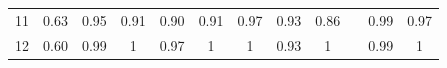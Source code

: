 \documentclass[twoside,11pt]{article}
\begin{document}
\begin{table}[H]
{\begin{tabular}{ccccccccclcc}
\multicolumn{1}{|c|}{11}                                                                          & \multicolumn{1}{c|}{0.63}                                                           & \multicolumn{1}{c|}{\cellcolor[HTML]{ECF4FF}0.95}                                              & \multicolumn{1}{c|}{0.91}                                                                & \multicolumn{1}{c|}{0.90}                                                                & \multicolumn{1}{c|}{0.91}                                                                & \multicolumn{1}{c|}{\cellcolor[HTML]{FFCCC9}0.97}                                           & \multicolumn{1}{c|}{0.93}                                                                   & \multicolumn{1}{c|}{0.86}                                                                   & \multicolumn{1}{l|}{}                    & \multicolumn{1}{c|}{0.99}                                                                      & \multicolumn{1}{c|}{0.97}                                                                      \\ \cline{1-1}
\multicolumn{1}{|c|}{12}                                                                          & \multicolumn{1}{c|}{0.60}                                                           & \multicolumn{1}{c|}{\cellcolor[HTML]{ECF4FF}0.99}                                              & \multicolumn{1}{c|}{1}                                                                   & \multicolumn{1}{c|}{0.97}                                                                & \multicolumn{1}{c|}{\cellcolor[HTML]{FFCCC9}1}                                           & \multicolumn{1}{c|}{\cellcolor[HTML]{FFCCC9}1}                                              & \multicolumn{1}{c|}{0.93}                                                                   & \multicolumn{1}{c|}{\cellcolor[HTML]{FFCCC9}1}                                              & \multicolumn{1}{l|}{}                    & \multicolumn{1}{c|}{0.99}                                                                      & \multicolumn{1}{c|}{1}                                                                         \\ \cline{1-1}

\end{tabular}}
\end{table}
\end{document}
